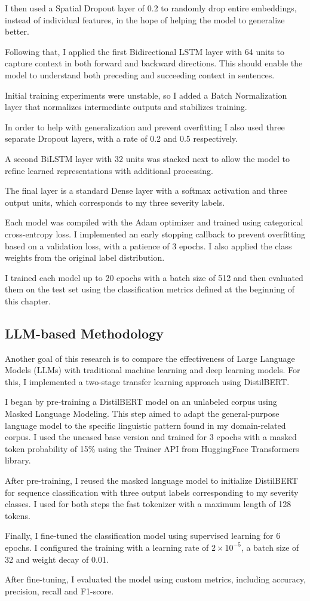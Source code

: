 I then used a Spatial Dropout layer of 0.2 to randomly drop entire embeddings, instead of individual features, in the hope of helping the model to generalize better.

Following that, I applied the first Bidirectional LSTM layer with 64 units to capture context in both forward and backward directions. This should enable the model to understand both preceding and succeeding context in sentences.

Initial training experiments were unstable, so I added a Batch Normalization layer that normalizes intermediate outputs and stabilizes training.

In order to help with generalization and prevent overfitting I also used three separate Dropout layers, with a rate of 0.2 and 0.5 respectively.

A second BiLSTM layer with 32 units was stacked next to allow the model to refine learned representations with additional processing.

The final layer is a standard Dense layer with a softmax activation and three output units, which corresponds to my three severity labels.

Each model was compiled with the Adam optimizer and trained using categorical cross-entropy loss. I implemented an early stopping callback to prevent overfitting based on a validation loss, with a patience of 3 epochs. I also applied the class weights from the original label distribution.

I trained each model up to 20 epochs with a batch size of 512 and then evaluated them on the test set using the classification metrics defined at the beginning of this chapter.

\subsection{LLM-based Methodology}

Another goal of this research is to compare the effectiveness of Large Language Models (LLMs) with traditional machine learning and deep learning models. For this, I implemented a two-stage transfer learning approach using DistilBERT.

I began by pre-training a DistilBERT model on an unlabeled corpus using Masked Language Modeling. This step aimed to adapt the general-purpose language model to the specific linguistic pattern found in my domain-related corpus. I used the uncased base version and trained for 3 epochs with a masked token probability of 15\% using the Trainer API from HuggingFace Transformers library.

After pre-training, I reused the masked language model to initialize DistilBERT for sequence classification with three output labels corresponding to my severity classes. I used for both steps the fast tokenizer with a maximum length of 128 tokens.

Finally, I fine-tuned the classification model using supervised learning for 6 epochs. I configured the training with a learning rate of $2 \times 10^{-5}$, a batch size of 32 and weight decay of 0.01.

After fine-tuning, I evaluated the model using custom metrics, including accuracy, precision, recall and F1-score.